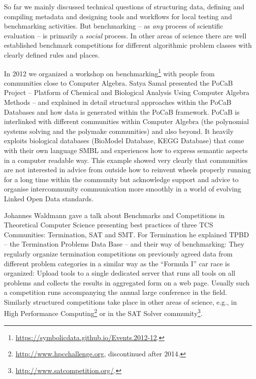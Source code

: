 \documentclass[12pt]{article}
\begin{document}
So far we mainly discussed technical questions of structuring data, defining
and compiling metadata and designing tools and workflows for local testing and
benchmarking activities.  But benchmarking -- as \emph{any} process of
scientific evaluation -- is primarily a \emph{social} process.  In other areas
of science there are well established benchmark competitions for different
algorithmic problem classes with clearly defined rules and places.

In 2012 we organized a workshop on
benchmarking\footnote{\url{https://symbolicdata.github.io/Events.2012-12}.}
with people from communities close to Computer Algebra.  Satya Samal presented
the PoCaB Project -- Platform of Chemical and Biological Analysis Using
Computer Algebra Methods -- and explained in detail structural approaches
within the PoCaB Databases and how data is generated within the PoCaB
framework.  PoCaB is interlinked with different communities within Computer
Algebra (the polynomial systems solving and the polymake communities) and also
beyond. It heavily exploits biological databases (BioModel Database, KEGG
Database) that come with their own language SMBL and experiences how to
express semantic aspects in a computer readable way. This example showed very
clearly that communities are not interested in advice from outside how to
reinvent wheels properly running for a long time within the community but
acknowledge support and advice to organise intercommunity communication more
smoothly in a world of evolving Linked Open Data standards.

Johannes Waldmann gave a talk about Benchmarks and Competitions in Theoretical
Computer Science presenting best practices of three TCS Communities:
Termination, SAT and SMT. For Termination he explained TPBD -- the Termination
Problems Data Base -- and their way of benchmarking: They regularly organize
termination competitions on previously agreed data from different problem
categories in a similar way as the “Formula I” car race is organized: Upload
tools to a single dedicated server that runs all tools on all problems and
collects the results in aggregated form on a web page. Usually such a
competition runs accompanying the annual large conference in the field.
Similarly structured competitions take place in other areas of science, e.g.,
in High Performance Computing\footnote{\url{http://www.hpcchallenge.org},
  discontinued after 2014.} or in the SAT Solver
community\footnote{\url{http://www.satcompetition.org/}.}.
\end{document}
